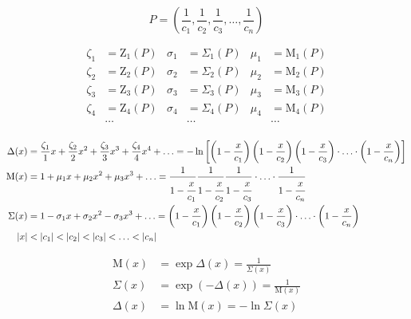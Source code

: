 \begin{equation*}
P =
\left( 
\frac{1}{c_1},
\frac{1}{c_2}, 
\frac{1}{c_3}, 
{} \ldots, 
\frac{1}{c_n}
\right) 
\end{equation*}

\begin{equation*} \begin{aligned}
\zeta_1 &= \mathrm{Z}_1(P)
&
\sigma_1 &= \Sigma_1(P)
&
\mu_1 &= \mathrm{M}_1(P)
\\
\zeta_2 &= \mathrm{Z}_2(P)
&
\sigma_2 &= \Sigma_2(P)
&
\mu_2 &= \mathrm{M}_2(P)
\\
\zeta_3 &= \mathrm{Z}_3(P)
&
\sigma_3 &= \Sigma_3(P)
&
\mu_3 &= \mathrm{M}_3(P)
\\
\zeta_4 &= \mathrm{Z}_4(P)
&
\sigma_4 &= \Sigma_4(P)
&
\mu_4 &= \mathrm{M}_4(P)
\\
&\ldots
&
&\ldots
&
&\ldots
\\
\end{aligned} \end{equation*}

\begin{equation*} \begin{aligned}
\Delta(x) &=
  \frac{\zeta_1}{1} x
+ \frac{\zeta_2}{2} x^2
+ \frac{\zeta_3}{3} x^3
+ \frac{\zeta_4}{4} x^4
+ \ldots =
- \ln{
  \left[
  \left(1 - \frac{x}{c_1} \right)
  \left(1 - \frac{x}{c_2} \right)
  \left(1 - \frac{x}{c_3} \right)
  \cdot \ldots \cdot
  \left(1 - \frac{x}{c_n} \right)
  \right]
  } \\
%
\mathrm{M}(x) &=
  1
+ \mu_1 x
+ \mu_2 x^2
+ \mu_3 x^3
+ \ldots =
  \frac{1}{1 - \cfrac{x}{c_1}}
  \frac{1}{1 - \cfrac{x}{c_2}}
  \frac{1}{1 - \cfrac{x}{c_3}}
  \cdot \ldots \cdot
  \frac{1}{1 - \cfrac{x}{c_n}} \\
%
\Sigma(x) &=
  1
- \sigma_1 x
+ \sigma_2 x^2
- \sigma_3 x^3
+ \ldots =
  \left(1 - \frac{x}{c_1} \right)
  \left(1 - \frac{x}{c_2} \right)
  \left(1 - \frac{x}{c_3} \right)
  \cdot \ldots \cdot 
  \left(1 - \frac{x}{c_n} \right) \\
%
|x| &< |c_1| < |c_2| < |c_3| < \ldots < |c_n| \\
\end{aligned} \end{equation*}

\begin{equation*} \begin{aligned}
\mathrm{M}(x) &= \exp{\Delta(x)} = \frac{1}{\Sigma(x)} \\
\Sigma(x) &= \exp{(- \Delta(x))} = \frac{1}{\mathrm{M}(x)} \\
\Delta(x) &= \ln{\mathrm{M}(x)} = - \ln{\Sigma(x)} \\
\end{aligned} \end{equation*}

